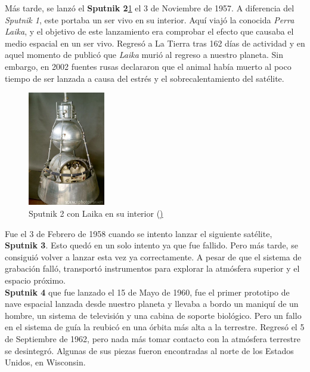 Más tarde, se lanzó el \textbf{Sputnik 2}\ref{s2} el 3 de Noviembre de 1957. A diferencia del \textit{Sputnik 1}, este portaba un ser vivo en su interior. Aquí viajó la conocida \textit{Perra Laika}, y el objetivo de este lanzamiento era comprobar el efecto que causaba el medio espacial en un ser vivo. Regresó a La Tierra tras 162 días de actividad y en aquel momento de publicó que \textit{Laika} murió al regreso a nuestro planeta. Sin embargo, en 2002 fuentes rusas declararon que el animal había muerto al poco tiempo de ser lanzada a causa del estrés y el sobrecalentamiento del satélite.\\

\begin{figure}[H]
\begin{center}
  \includegraphics[width=0.3\textwidth]{./EtapaPrimeriza/imagenes/s2.jpg}
  \caption{Sputnik 2 con Laika en su interior (\href{http://www.alas-rojas.com/1-2.htm})}
  \label{s2}
\end{center}
\end{figure}

Fue el 3 de Febrero de 1958 cuando se intento lanzar el siguiente satélite, \textbf{Sputnik 3}. Esto quedó en un solo intento ya que fue fallido. Pero más tarde, se consiguió volver a lanzar esta vez ya correctamente. A pesar de que el sistema de grabación falló, transportó instrumentos para explorar la atmósfera superior y el espacio próximo.\\

\textbf{Sputnik 4} que fue lanzado el 15 de Mayo de 1960, fue el primer prototipo de nave espacial lanzada desde nuestro planeta y llevaba a bordo un maniquí de un hombre, un sistema de televisión y una cabina de soporte biológico. Pero un fallo en el sistema de guía la reubicó en una órbita más alta a la terrestre. Regresó el 5 de Septiembre de 1962, pero nada más tomar contacto con la atmósfera terrestre se desintegró. Algunas de sus piezas fueron encontradas al norte de los Estados Unidos, en Wisconsin.\\

